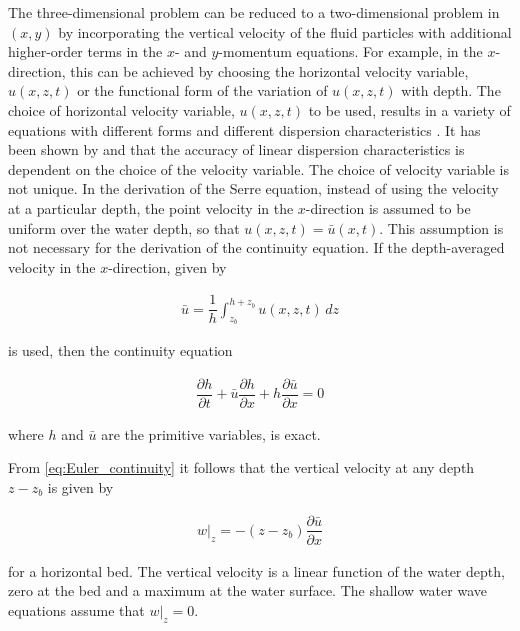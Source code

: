 \documentclass[SingleSpace,12pt]{Serre_ASCE}
\begin{document}
The three-dimensional problem can be reduced to a two-dimensional problem in $(x,y)$ by incorporating the vertical velocity of the fluid particles with additional higher-order terms in the $x$- and $y$-momentum equations. For example, in the $x$-direction, this can be achieved by choosing the horizontal velocity variable, $u(x,z,t)$ or the functional form of the variation of $u(x,z,t)$ with depth.  The choice of horizontal velocity variable, $u(x,z,t)$ to be used, results in a variety of equations with different forms and different dispersion characteristics \cite{Madsen-etal-1991-371,Beji-Nadaoka-1996,Madsen-Sorensen-1992-183,Witting-J-1984-203,Zou-Z-1999-767}. It has been shown by  and  that the accuracy of linear dispersion characteristics is dependent on the choice of the velocity variable. The choice of velocity variable is not unique. In the derivation of the Serre equation, instead of using the velocity at a particular depth, the point velocity in the $x$-direction is assumed to be uniform over the water depth, so that $u(x,z,t) = \bar{u}(x,t)$. This assumption is not necessary for the derivation of the continuity equation. If the depth-averaged velocity in the $x$-direction, given by
\begin{linenomath*}
\begin{gather*}
\bar{u} = \dfrac{1}{h} \int_{z_b}^{h+z_b} u(x,z,t) \, dz
\end{gather*}
\end{linenomath*}
is used, then the continuity equation
\begin{linenomath*}
\begin{gather}
\dfrac{\partial h}{\partial t} + \bar{u} \dfrac{\partial h}{\partial x} +  h \dfrac{\partial \bar{u}}{\partial x} = 0 %
\label{eq:Boussinsq_continuity}
\end{gather}
\end{linenomath*}
where $h$ and $\bar{u}$ are the primitive variables, is exact.

From \eqref{eq:Euler_continuity} it follows that the vertical velocity at any depth $z - z_b$ is given by
\begin{linenomath*}
\begin{gather}
w |_z = -(z - z_b) \dfrac{\partial \bar{u}}{\partial x}
\label{eq:depth-averaged}
\end{gather}
\end{linenomath*}
for a horizontal bed. The vertical velocity is a linear function of the water depth, zero at the bed and a maximum at the water surface. The shallow water wave equations assume that $w|_z = 0$.
\end{document}
